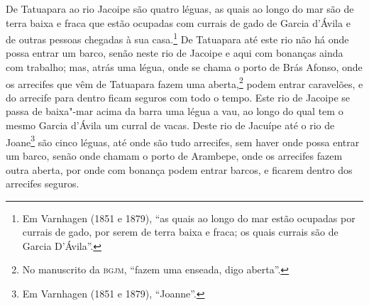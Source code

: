 De Tatuapara ao rio Jacoipe são quatro léguas, as quais ao longo do mar são de terra baixa
e fraca que estão ocupadas com currais de gado de Garcia d'Ávila e de outras pessoas
chegadas à sua casa.\footnote{ Em Varnhagen (1851 e 1879), ``as quais ao longo do mar
estão ocupadas por currais de gado, por serem de terra baixa e fraca; os quais currais são
de Garcia D'Ávila''.} De Tatuapara até este rio não há onde possa entrar um barco, senão
neste rio de Jacoipe e aqui com bonanças ainda com trabalho; mas, atrás uma légua, onde se
chama o porto de Brás Afonso, onde os arrecifes que vêm de Tatuapara fazem uma
aberta,\footnote{ No manuscrito da \textsc{bgjm}, ``fazem uma enseada, digo aberta''.}
podem entrar caravelões, e do arrecife para dentro ficam seguros com todo o tempo. Este
rio de Jacoipe se passa de baixa"-mar acima da barra uma légua a vau, ao longo do qual tem
o mesmo Garcia d'Ávila um curral de vacas. Deste rio de Jacuípe até o rio de
Joane\footnote{ Em Varnhagen (1851 e 1879), ``Joanne''.} são cinco léguas, até onde são
tudo arrecifes, sem haver onde possa entrar um barco, senão onde chamam o porto de
Arambepe, onde os arrecifes fazem outra aberta, por onde com bonança podem entrar barcos,
e ficarem dentro dos arrecifes seguros.

